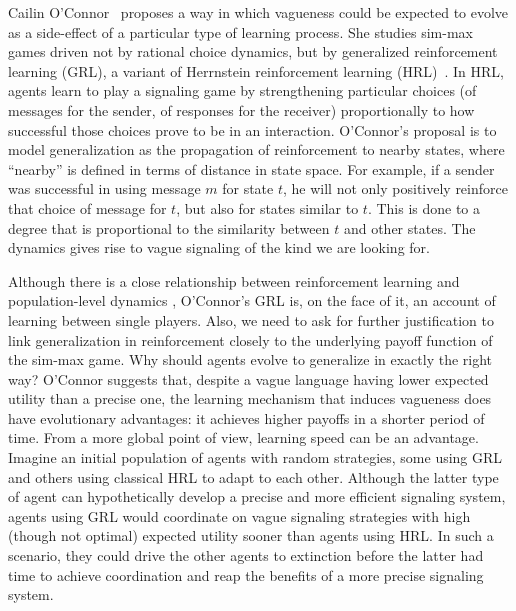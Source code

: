\documentclass[a4paper]{article}
\begin{document}
Cailin O'Connor~\parencite*{oconnor_evolution_2014} proposes a way in which vagueness could be expected to evolve as a side-effect of a particular type of learning process.
She studies sim-max games driven not by rational choice dynamics, but by generalized reinforcement learning (GRL), a variant of Herrnstein reinforcement learning (HRL)~\parencite{roth_learning_1995}.
In HRL, agents learn to play a signaling game by strengthening particular choices (of messages for the sender, of responses for the receiver) proportionally to how successful those choices prove to be in an interaction.
O'Connor's proposal is to model generalization as the propagation of reinforcement to nearby states, where ``nearby'' is defined in terms of distance in state space.
For example, if a sender was successful in using message $m$ for state $t$, he will not only positively reinforce that choice of message for $t$, but also for states similar to $t$.
This is done to a degree that is proportional to the similarity between $t$ and other states.
The dynamics gives rise to vague signaling of the kind we are looking for.

Although there is a close relationship between reinforcement learning and population-level dynamics \citep{Borgers1997,Beggs2005}, O'Connor's GRL is, on the face of it, an account of learning between single players.
Also, we need to ask for further justification to link generalization in reinforcement closely to the underlying payoff function of the sim-max game.
Why should agents evolve to generalize in exactly the right way?
O'Connor suggests that, despite a vague language having lower expected utility than a precise one, the learning mechanism that induces vagueness does have evolutionary advantages: it achieves higher payoffs in a shorter period of time.
From a more global point of view, learning speed can be an advantage.
Imagine an initial population of agents with random strategies, some using GRL and others using classical HRL to adapt to each other.
Although the latter type of agent can hypothetically develop a precise and more efficient signaling system, agents using GRL would coordinate on vague signaling strategies with high (though not optimal) expected utility sooner than agents using HRL.
In such a scenario, they could drive the other agents to extinction before the latter had time to achieve coordination and reap the benefits of a more precise signaling system.
\end{document}
